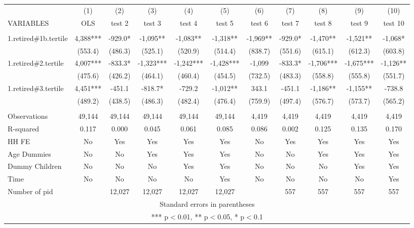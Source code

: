 \begin{tabular}{lcccccccccc} \hline
 & (1) & (2) & (3) & (4) & (5) & (6) & (7) & (8) & (9) & (10) \\
VARIABLES & OLS & test 2 & test 3 & test 4 & test 5 & test 6 & test 7 & test 8 & test 9 & test 10 \\ \hline
 &  &  &  &  &  &  &  &  &  &  \\
1.retired\#1b.tertile & 4,388*** & -929.0* & -1,095** & -1,083** & -1,318** & -1,969** & -929.0* & -1,470** & -1,521** & -1,068* \\
 & (553.4) & (486.3) & (525.1) & (520.9) & (514.4) & (838.7) & (551.6) & (615.1) & (612.3) & (603.8) \\
1.retired\#2.tertile & 4,007*** & -833.3* & -1,323*** & -1,242*** & -1,428*** & -1,099 & -833.3* & -1,706*** & -1,675*** & -1,126** \\
 & (475.6) & (426.2) & (464.1) & (460.4) & (454.5) & (732.5) & (483.3) & (558.8) & (555.8) & (551.7) \\
1.retired\#3.tertile & 4,451*** & -451.1 & -818.7* & -729.2 & -1,012** & 343.1 & -451.1 & -1,186** & -1,155** & -738.8 \\
 & (489.2) & (438.5) & (486.3) & (482.4) & (476.4) & (759.9) & (497.4) & (576.7) & (573.7) & (565.2) \\
 &  &  &  &  &  &  &  &  &  &  \\
Observations & 49,144 & 49,144 & 49,144 & 49,144 & 49,144 & 4,419 & 4,419 & 4,419 & 4,419 & 4,419 \\
R-squared & 0.117 & 0.000 & 0.045 & 0.061 & 0.085 & 0.086 & 0.002 & 0.125 & 0.135 & 0.170 \\
HH FE & No & Yes & Yes & Yes & Yes & No & Yes & Yes & Yes & Yes \\
Age Dummies & No & No & Yes & Yes & Yes & No & No & Yes & Yes & Yes \\
Dummy Children & No & No & No & Yes & Yes & No & No & No & Yes & Yes \\
Time & No & No & No & No & Yes & No & No & No & No & Yes \\
 Number of pid &  & 12,027 & 12,027 & 12,027 & 12,027 &  & 557 & 557 & 557 & 557 \\ \hline
\multicolumn{11}{c}{ Standard errors in parentheses} \\
\multicolumn{11}{c}{ *** p$<$0.01, ** p$<$0.05, * p$<$0.1} \\
\end{tabular}
